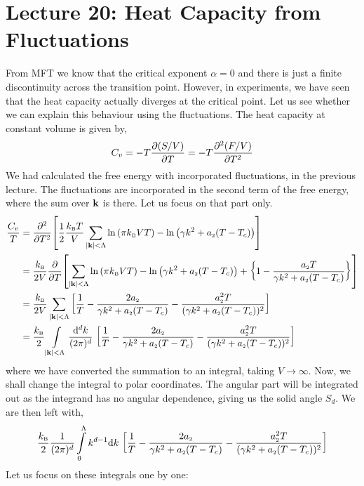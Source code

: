 \section*{Lecture 20: Heat Capacity from Fluctuations}

From MFT we know that the critical exponent $\alpha=0$ and there is just a finite discontinuity across the transition point. However, in experiments, we have seen that the heat capacity actually diverges at the critical point. Let us see whether we can explain this behaviour using the fluctuations. The heat capacity at constant volume is given by,
$$C_v = -T \pdv{(S/V)}{T} = - T \pdv[2]{(F/V)}{T}$$
We had calculated the free energy with incorporated fluctuations, in the previous lecture. The fluctuations are incorporated in the second term of the free energy, where the sum over $\vb{k}$ is there. Let us focus on that part only. 
\begin{align*}
    \frac{C_v}{T}  &= \pdv[2]{T}\qty[\frac{1}{2}\frac{k_{\text{\tiny B}} T}{V}\sum\limits_{\abs{\vb{k}}<\Lambda}\ln\qty(\pi k_{\text{\tiny B}} VT)-\ln\qty(\gamma k^2+a_{\text{\tiny 2}}(T-T_c))]\\
    &=\frac{k_{\text{\tiny B}}}{2 V} \pdv{T}\qty[\sum\limits_{\abs{\vb{k}}<\Lambda}\ln\qty(\pi k_{\text{\tiny B}} VT)-\ln\qty(\gamma k^2+a_{\text{\tiny 2}}(T-T_c)) + \qty{1 - \frac{a_{\text{\tiny 2}}T}{\gamma k^2+a_{\text{\tiny 2}}(T-T_c)}}]\\
    &=\frac{k_{\text{\tiny B}}}{2 V}\sum\limits_{\abs{\vb{k}}<\Lambda}\qty[ \frac{1}{T} - \frac{2a_{\text{\tiny 2}}}{\gamma k^2+a_{\text{\tiny 2}}(T-T_c)}-\frac{a_{\text{\tiny 2}}^2T}{(\gamma k^2 +a_{\text{\tiny 2}}(T-T_c))^2}]\\
    &=\frac{k_{\text{\tiny B}}}{2}\int\limits_{\abs{\vb{k}}<\Lambda}\frac{\dd^d k}{(2\pi)^d}\ \qty[ \frac{1}{T} - \frac{2a_{\text{\tiny 2}}}{\gamma k^2+a_{\text{\tiny 2}}(T-T_c)}-\frac{a_{\text{\tiny 2}}^2T}{(\gamma k^2 +a_{\text{\tiny 2}}(T-T_c))^2}]
\end{align*}
where we have converted the summation to an integral, taking $V\to \infty$. Now, we shall change the integral to polar coordinates. The angular part will be integrated out as the integrand has no angular dependence, giving us the solid angle $S_d$. We are then left with, 
\begin{align*}
    \frac{\kb}{2}\frac{1}{(2\pi)^d}\int\limits_0^\Lambda k^{d-1}\dd k \ \qty[ \frac{1}{T} - \frac{2a\tund{2}}{\gamma k^2+a\tund{2}(T-T_c)}-\frac{a\tund{2}^2T}{(\gamma k^2 +a\tund{2}(T-T_c))^2}]
\end{align*}
Let us focus on these integrals one by one:
